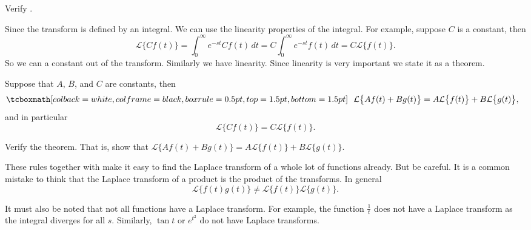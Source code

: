 \begin{exercise}
Verify .
\end{exercise}

Since the transform is defined by an integral.  We can use the linearity
properties of the integral.  For example, suppose $C$ is a constant, then
\begin{equation*}
\mathcal{L} \bigl\{ C f(t) \bigr\} =
\int_0^\infty e^{-st} C f(t) \,dt =
C \int_0^\infty e^{-st} f(t) \,dt =
C \mathcal{L} \bigl\{ f(t) \bigr\} .
\end{equation*}
So we can  a constant out of the transform.  Similarly  we have
linearity.
Since linearity is very important we state it as a theorem.

\begin{theorem}
Suppose that $A$, $B$, and $C$ are constants, then
\begin{equation*}
\mybxbg{~~
\mathcal{L} \bigl\{ A f(t) + B g(t) \bigr\} =
A \mathcal{L} \bigl\{ f(t) \bigr\} +
B \mathcal{L} \bigl\{ g(t) \bigr\} ,
~~}
\end{equation*}
and in particular
\begin{equation*}
\mathcal{L} \bigl\{ C f(t) \bigr\} =
C \mathcal{L} \bigl\{ f(t) \bigr\} .
\end{equation*}
\end{theorem}

\begin{exercise}
Verify the theorem.  That is, show that
$\mathcal{L} \bigl\{ A f(t) + B g(t) \bigr\} =
A \mathcal{L} \bigl\{ f(t) \bigr\} +
B \mathcal{L} \bigl\{ g(t) \bigr\}$.
\end{exercise}

These rules together with  make it easy to find
the Laplace transform of a whole lot of functions already.
But be careful.
It is a common mistake to think that the Laplace transform of a product
is the product of the transforms.  In general 
\begin{equation*}
\mathcal{L} \bigl\{ f(t) g(t) \bigr\} \not=
\mathcal{L} \bigl\{ f(t) \bigr\}
\mathcal{L} \bigl\{ g(t) \bigr\} .
\end{equation*}

It must also be noted that not all functions have a Laplace transform.  For
example, the function $\frac{1}{t}$ does not have a Laplace transform as the
integral diverges for all $s$.  Similarly,
$\tan t$ or $e^{t^2}$ do not have Laplace transforms.

